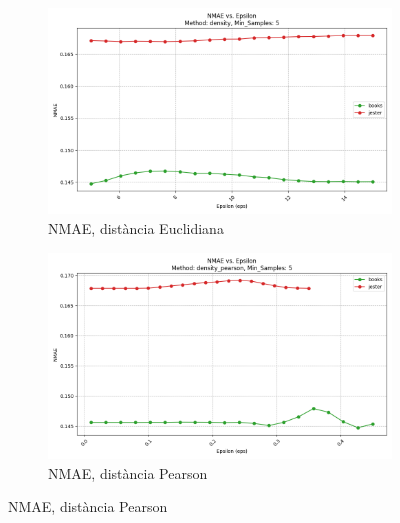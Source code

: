 \documentclass[a4paper,12pt]{report}
\begin{document}
\begin{figure}[H]
    \centering
    \begin{subfigure}[b]{0.49\textwidth}
        \includegraphics[width=\textwidth]{Figuras/DBSCAN/res/books_jester_density_nmae_vs_eps.png}
        \caption{NMAE, distància Euclidiana}
        \label{fig:dbscan2-clustering-results-a}
    \end{subfigure}
    \hfill
    \begin{subfigure}[b]{0.49\textwidth}
        \includegraphics[width=\textwidth]{Figuras/DBSCAN/res/books_jester_density_pearson_nmae_vs_eps.png}
        \caption{NMAE, distància Pearson}
        \label{fig:dbscan2-clustering-results-b}
    \end{subfigure}

    \vspace{1em}


\end{figure}
\end{document}
